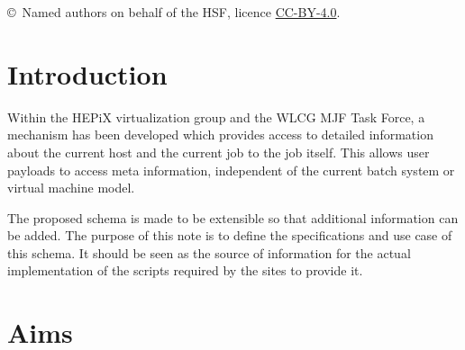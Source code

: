 \documentclass[12pt,a4paper]{article}
\begin{document}
\begin{titlepage}
\begin{abstract}
\end{abstract}

\vspace*{2.0cm}

\vspace{\fill}

{\footnotesize 
\centerline{\copyright~Named authors on behalf of the HSF, licence \href{http://creativecommons.org/licenses/by/4.0/}{CC-BY-4.0}.}}
\vspace*{2mm}

\end{titlepage}


\cleardoublepage

\renewcommand{\thefootnote}{\arabic{footnote}}
\setcounter{footnote}{0}


\pagestyle{plain} %
\setcounter{page}{1}


\section{Introduction}
\label{sec:Introduction}

Within the HEPiX virtualization group\cite{HEPIXMJF} and the 
WLCG MJF Task Force\cite{WLCGMJF}, a mechanism 
has been developed which provides
access to detailed information about the current host and the current job to
the job itself. This allows user
payloads to access meta information, independent of the current batch
system or virtual machine model. 

The proposed schema is made to be extensible so that 
additional information can be added. The purpose of this note is to define the
specifications and use case of this schema. It should be seen as the source
of information for the actual implementation of the scripts required by the
sites to provide it.

\section{Aims}
\label{sec:Aims}
\end{document}

